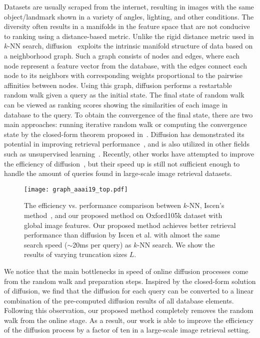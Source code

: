 \documentclass[letterpaper]{article} \usepackage{aaai19}  \usepackage{times}  \usepackage{helvet}  \usepackage{courier}  \usepackage{url}  \usepackage{graphicx}  \frenchspacing  \setlength{\pdfpagewidth}{8.5in}  \setlength{\pdfpageheight}{11in}
\begin{document}
Datasets are usually scraped from the internet, resulting in images with the same object/landmark shown in a variety of angles, lighting, and other conditions.
The diversity often results in a manifolds in the feature space that are not conducive to ranking using a distance-based metric.
Unlike the rigid distance metric used in $k$-NN search, diffusion~\cite{zhou2004ranking,zhou2004learning,donoser2013diffusion,grady2006random} exploits the intrinsic manifold structure of data based on a neighborhood graph.
Such a graph consists of nodes and edges, where each node represent a feature vector from the database, with the edges connect each node to its neighbors with corresponding weights proportional to the pairwise affinities between nodes.
Using this graph, diffusion performs a restartable random walk given a query as the initial state.
The final state of random walk can be viewed as ranking scores showing the similarities of each image in database to the query.
To obtain the convergence of the final state, there are two main approaches: running iterative random walk or computing the convergence state by the closed-form theorem proposed in~\cite{zhou2004ranking}.
Diffusion has demonstrated its potential in improving retrieval performance~\cite{donoser2013diffusion,iscen2017efficient,radenovic2018revisiting}, and is also utilized in other fields such as unsupervised learning~\cite{iscen2018mining}.
Recently, other works have attempted to improve the efficiency of diffusion~\cite{iscen2017efficient}, but their speed up is still not sufficient enough to handle the amount of queries found in large-scale image retrieval datasets.


\begin{figure}[t!]
  \centering
  \texttt{[image: graph\_aaai19\_top.pdf]}
  \caption{The efficiency vs. performance comparison between $k$-NN, Iscen's method~\cite{iscen2017efficient}, and our proposed method on Oxford105k dataset with global image features. 
  Our proposed method achieves better retrieval performance than diffusion by Iscen et al. with almost the same search speed ($\sim$20ms per query) as $k$-NN search. We show the results of varying truncation sizes $L$.}
  \label{fig:top}
\vspace{-4mm}
\end{figure}

We notice that the main bottlenecks in speed of online diffusion processes come from the random walk and preparation steps.
Inspired by the closed-form solution of diffusion, we find that the diffusion for each query can be converted to a linear combination of the pre-computed diffusion results of all database elements.
Following this observation, our proposed method completely removes the random walk from the online stage.
As a result, our work is able to improve the efficiency of the diffusion process by a factor of ten in a large-scale image retrieval setting.
\end{document}
